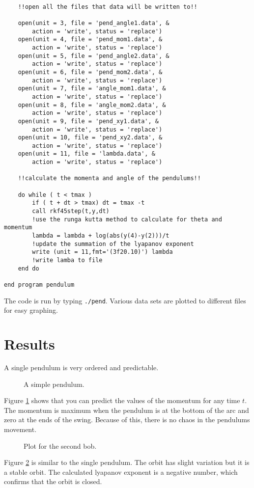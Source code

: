 \documentclass[12pt]{article}
\begin{document}
\begin{lstlisting}[frame=single,caption={{\tt adpend.f95}},label=adpend]
	
	!!open all the files that data will be written to!!

	open(unit = 3, file = 'pend_angle1.data', &
	    action = 'write', status = 'replace')
	open(unit = 4, file = 'pend_mom1.data', &
	    action = 'write', status = 'replace')
	open(unit = 5, file = 'pend_angle2.data', &
	    action = 'write', status = 'replace')
	open(unit = 6, file = 'pend_mom2.data', &
	    action = 'write', status = 'replace')
	open(unit = 7, file = 'angle_mom1.data', &
	    action = 'write', status = 'replace')
	open(unit = 8, file = 'angle_mom2.data', &
	    action = 'write', status = 'replace')
	open(unit = 9, file = 'pend_xy1.data', &
	    action = 'write', status = 'replace')
	open(unit = 10, file = 'pend_xy2.data', &
	    action = 'write', status = 'replace')
	open(unit = 11, file = 'lambda.data', &
	    action = 'write', status = 'replace')

	!!calculate the momenta and angle of the pendulums!!

	do while ( t < tmax )
		if ( t + dt > tmax) dt = tmax -t
		call rkf45step(t,y,dt)						
		!use the runga kutta method to calculate for theta and momentum
		lambda = lambda + log(abs(y(4)-y(2)))/t 	
		!update the summation of the lyapanov exponent
		write (unit = 11,fmt='(3f20.10)') lambda 	
		!write lamba to file
	end do

end program pendulum

\end{lstlisting}


The code is run by typing {\tt ./pend}. Various data sets are plotted to different files for easy graphing.
\section{Results}

A single pendulum is very ordered and predictable.  

\begin {figure}[!htb]
	\resizebox{\columnwidth}{!}{}
	\caption{A simple pendulum. }
	\label{singlependulum}
\end {figure}

Figure \ref{singlependulum} shows that you can predict the values of the momentum for any time $t$. The momentum is maximum when the pendulum is at the bottom of the arc and zero at the ends of the swing. Because of this, there is no chaos in the pendulums movement.

\begin {figure}[!htb]
	\resizebox{\columnwidth}{!}{}
	\caption{Plot for the second bob. }
	\label{dobulepend1}
\end {figure}
Figure \ref{dobulepend1} is similar to the single pendulum. The orbit has slight variation but it is a stable orbit. The calculated lyapanov exponent is a negative number, which confirms that the orbit is closed. 
\end{document}
